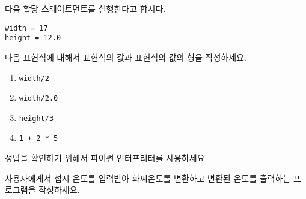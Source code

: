 \begin{ex}
다음 할당 스테이트먼트를 실행한다고 합시다.

\begin{verbatim}
width = 17
height = 12.0
\end{verbatim}

다음 표현식에 대해서 표현식의 값과 표현식의 값의 형을 작성하세요.

\begin{enumerate}

\item {\tt width/2}

\item {\tt width/2.0}

\item {\tt height/3}

\item {\tt 1 + 2 * 5}

\end{enumerate}

정답을 확인하기 위해서 파이썬 인터프리터를 사용하세요.

\end{ex}

\begin{ex}
사용자에게서 섭시 온도를 입력받아 화씨온도롤 변환하고 변환된 온도를 출력하는 프로그램을 작성하세요.
\end{ex}


